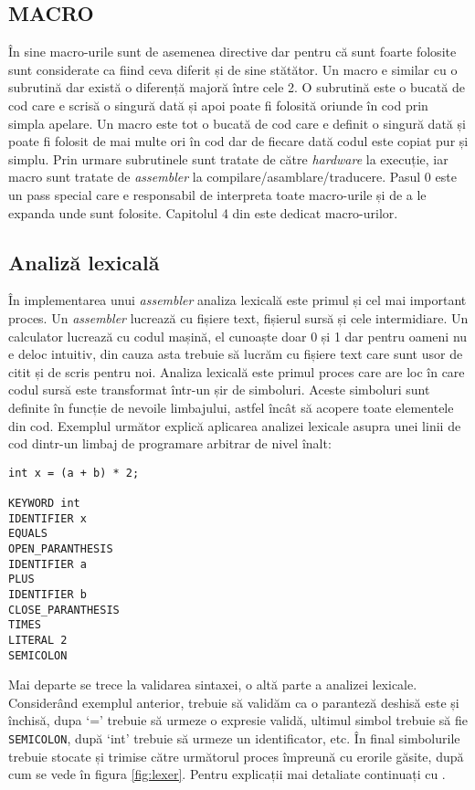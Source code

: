 \documentclass[../main.tex]{subfiles}
\begin{document}
\subsection{MACRO}
În sine macro-urile sunt de asemenea directive dar pentru că sunt foarte folosite sunt considerate ca fiind ceva diferit
și de sine stătător. Un macro e similar cu o subrutină dar există o diferență majoră între cele 2. O subrutină este o
bucată de cod care e scrisă o singură dată și apoi poate fi folosită oriunde în cod prin simpla apelare. Un macro este
tot o bucată de cod care e definit o singură dată și poate fi folosit de mai multe ori în cod dar de fiecare dată codul
este copiat pur și simplu. Prin urmare subrutinele sunt tratate de către \emph{hardware} la execuție, iar macro sunt
tratate de \emph{assembler} la compilare/asamblare/traducere. Pasul 0 este un pass special care e responsabil de interpreta
toate macro-urile și de a le expanda unde sunt folosite. Capitolul 4 din \cite{asl} este dedicat macro-urilor.

\subsection{Analiză lexicală}
În implementarea unui \emph{assembler} analiza lexicală este primul și cel mai important proces. Un \emph{assembler}
lucrează cu fișiere text, fișierul sursă și cele intermidiare. Un calculator lucrează cu codul mașină, el cunoaște doar
0 și 1 dar pentru oameni nu e deloc intuitiv, din cauza asta trebuie să lucrăm cu fișiere text care sunt usor de citit
și de scris pentru noi. Analiza lexicală este primul proces care are loc în care codul sursă este transformat într-un 
șir de simboluri. Aceste simboluri sunt definite în funcție de nevoile limbajului, astfel încât să acopere toate
elementele din cod. Exemplul următor explică aplicarea analizei lexicale asupra unei linii de cod dintr-un limbaj
de programare arbitrar de nivel înalt:

{\ttfamily
    \begin{verbatim}
int x = (a + b) * 2;

KEYWORD int
IDENTIFIER x
EQUALS
OPEN_PARANTHESIS
IDENTIFIER a
PLUS
IDENTIFIER b
CLOSE_PARANTHESIS
TIMES
LITERAL 2
SEMICOLON
    \end{verbatim}
}

Mai departe se trece la validarea sintaxei, o altă parte a analizei lexicale. Considerând exemplul anterior, trebuie să
validăm ca o paranteză deshisă este și închisă, dupa `=' trebuie să urmeze o expresie validă, ultimul simbol trebuie să
fie \texttt{SEMICOLON}, după `int' trebuie să urmeze un identificator, etc. În final simbolurile trebuie stocate și trimise
către următorul proces împreună cu erorile găsite, după cum se vede în figura \ref{fig:lexer}. Pentru explicații mai
detaliate continuați cu \cite{lexer}.
\end{document}

